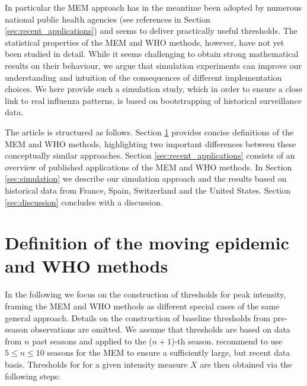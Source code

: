 \documentclass{article}
\begin{document}
In particular the MEM approach has in the meantime been adopted by numerous national public health agencies (see references in Section \ref{sec:recent_applications}) and seems to deliver practically useful thresholds. The statistical properties of the MEM and WHO methods, however, have not yet been studied in detail. While it seems challenging to obtain strong mathematical results on their behaviour, we argue that simulation experiments can improve our understanding and intuition of the consequences of different implementation choices. We here provide such a simulation study, which in order to ensure a close link to real influenza patterns, is based on bootstrapping of historical surveillance data.

The article is structured as follows. Section \ref{sec:definitions} provides concise definitions of the MEM and WHO methods, highlighting two important differences between these conceptually similar approaches. Section \ref{sec:recent_applications} consists of an overview of published applications of the MEM and WHO methods. In Section \ref{sec:simulation} we describe our simulation approach and the results based on historical data from France, Spain, Switzerland and the United States. Section \ref{sec:discussion} concludes with a discussion.

\section{Definition of the moving epidemic and WHO methods}
\label{sec:definitions}

In the following we focus on the construction of thresholds  for peak intensity, framing the MEM and WHO methods as different special cases of the same general approach. Details on the construction of baseline thresholds from pre-season observations are omitted. We assume that thresholds are based on data from $n$ past seasons and applied to the ($n + 1$)-th season. \cite{Vega2015} recommend to use $5 \leq n \leq 10$ seasons for the MEM to ensure a sufficiently large, but recent data basis. Thresholds for for a given intensity measure $X$ are then obtained via the following steps:
\end{document}
